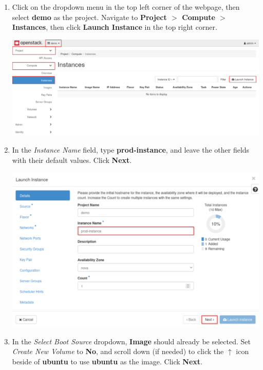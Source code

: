 \documentclass[letterpaper, 12pt]{article}
\begin{document}
\begin{enumerate}
    \item Click on the dropdown menu in the top left corner of the webpage, then select \textbf{demo} as the project. Navigate to \textbf{Project $>$ Compute $>$ Instances}, then click \textbf{Launch Instance} in the top right corner.

    \begin{center}
        \includegraphics[width=\linewidth]{images/part1/step5.png}
    \end{center}

    \item In the \textit{Instance Name} field, type \textbf{prod-instance}, and leave the other fields with their default values. Click \textbf{Next}.

    \begin{center}
        \includegraphics[width=\linewidth]{images/part1/step6.png}
    \end{center}

    \item In the \textit{Select Boot Source} dropdown, \textbf{Image} should already be selected. Set \textit{Create New Volume} to \textbf{No}, and scroll down (if needed) to click the $\uparrow$ icon beside of \textbf{ubuntu} to use \textbf{ubuntu} as the image. Click \textbf{Next}.


\end{enumerate}
\end{document}
